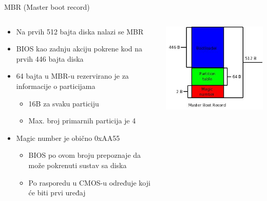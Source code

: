 \documentclass[croatian,t]{beamer} %
\begin{document}
	\begin{frame}{MBR (Master boot record)}
    \begin{columns}[c]
        \begin{column}{7cm}
            \begin{itemize}
            \item Na prvih 512 bajta diska nalazi se MBR
            \item BIOS kao zadnju akciju pokrene kod na prvih 446 bajta diska
            \item 64 bajta u MBR-u rezervirano je za informacije o particijama
            \begin{itemize}
            	\item 16B za svaku particiju
            	\item Max. broj primarnih particija je 4
            \end{itemize}
            \item Magic number je obično 0xAA55
            \begin{itemize}
            	\item BIOS po ovom broju prepoznaje da može pokrenuti sustav sa diska
            	\item Po rasporedu u CMOS-u određuje koji će biti prvi uređaj
            \end{itemize}
            \end{itemize}
        \end{column}
        \begin{column}{5cm}
            \includegraphics[scale=0.5]{../pics/mbr.jpg}
        \end{column}
    \end{columns}
	\end{frame}
	
\end{document}
